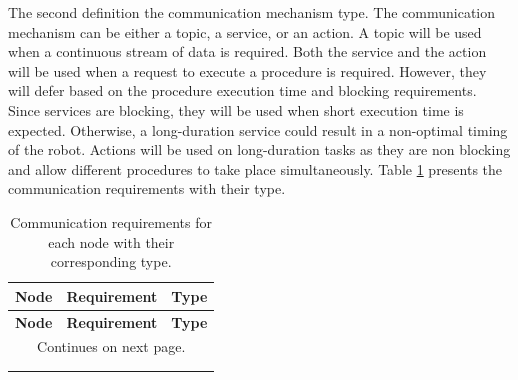 \documentclass{article}
\begin{document}
The second definition the communication mechanism type. The communication mechanism can be either a topic, a service, or an action. A topic will be used when a continuous stream of data is required. Both the service and the action will be used when a request to execute a procedure is required. However, they will defer based on the procedure execution time and blocking requirements. Since services are blocking, they will be used when short execution time is expected. Otherwise, a long-duration service could result in a non-optimal timing of the robot. Actions will be used on long-duration tasks as they are non blocking and allow different procedures to take place simultaneously. Table \ref{tab:comm_summary} presents the communication requirements with their type.

\begin{singlespace}
    \begin{longtable}{|l|l|p{10cm}|}
    
        \hline \multicolumn{1}{|c|}{\textbf{Node}} & \multicolumn{1}{c|}{\textbf{Requirement}} & \multicolumn{1}{c|}{\textbf{Type}} \\ \hline
        \endfirsthead
    
        \hline \multicolumn{1}{|c|}{\textbf{Node}} & \multicolumn{1}{c|}{\textbf{Requirement}} & \multicolumn{1}{c|}{\textbf{Type}} \\ \hline
        \endhead
        
        \hline \multicolumn{3}{|c|}{Continues on next page.} \\ \hline
        \endfoot
        
        \caption{Communication requirements for each node with their corresponding type.} \label{tab:comm_summary} \\
        \endlastfoot
        

\end{longtable}
\end{singlespace}
\end{document}
